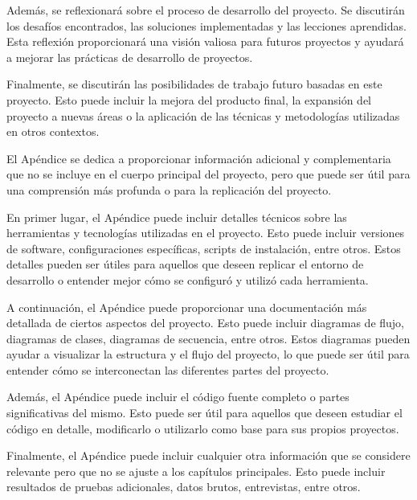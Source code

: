 Además, se reflexionará sobre el proceso de desarrollo del proyecto. Se discutirán los desafíos encontrados, las soluciones implementadas y las lecciones aprendidas. Esta reflexión proporcionará una visión valiosa para futuros proyectos y ayudará a mejorar las prácticas de desarrollo de proyectos.

Finalmente, se discutirán las posibilidades de trabajo futuro basadas en este proyecto. Esto puede incluir la mejora del producto final, la expansión del proyecto a nuevas áreas o la aplicación de las técnicas y metodologías utilizadas en otros contextos.

El Apéndice se dedica a proporcionar información adicional y complementaria que no se incluye en el cuerpo principal del proyecto, pero que puede ser útil para una comprensión más profunda o para la replicación del proyecto.

En primer lugar, el Apéndice puede incluir detalles técnicos sobre las herramientas y tecnologías utilizadas en el proyecto. Esto puede incluir versiones de software, configuraciones específicas, scripts de instalación, entre otros. Estos detalles pueden ser útiles para aquellos que deseen replicar el entorno de desarrollo o entender mejor cómo se configuró y utilizó cada herramienta.

A continuación, el Apéndice puede proporcionar una documentación más detallada de ciertos aspectos del proyecto. Esto puede incluir diagramas de flujo, diagramas de clases, diagramas de secuencia, entre otros. Estos diagramas pueden ayudar a visualizar la estructura y el flujo del proyecto, lo que puede ser útil para entender cómo se interconectan las diferentes partes del proyecto.

Además, el Apéndice puede incluir el código fuente completo o partes significativas del mismo. Esto puede ser útil para aquellos que deseen estudiar el código en detalle, modificarlo o utilizarlo como base para sus propios proyectos.

Finalmente, el Apéndice puede incluir cualquier otra información que se considere relevante pero que no se ajuste a los capítulos principales. Esto puede incluir resultados de pruebas adicionales, datos brutos, entrevistas, entre otros.